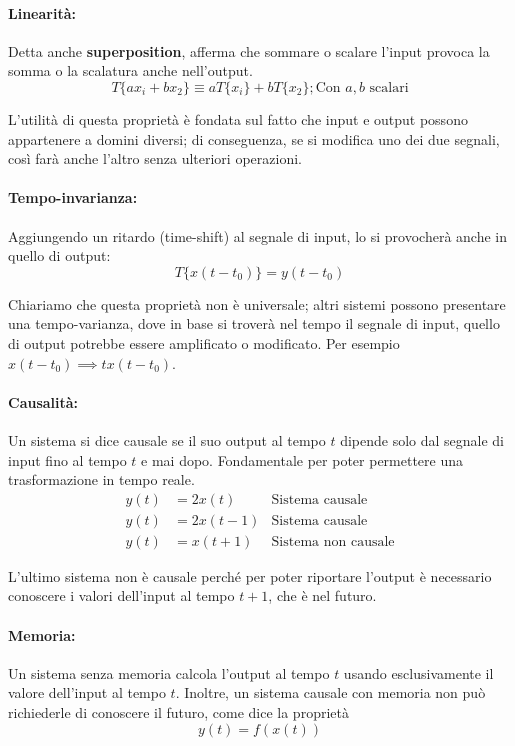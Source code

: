 \paragraph{Linearità:} Detta anche \textbf{superposition}, afferma che sommare o scalare l'input provoca la somma o la scalatura anche nell'output. \[
	T\{ax_i + bx_2\} \equiv aT\{x_i\} + bT\{x_2\}; \text{Con $a,b$ scalari}
\]

\noindent L'utilità di questa proprietà è fondata sul fatto che input e output possono appartenere a domini diversi; di conseguenza, se si modifica uno
dei due segnali, così farà anche l'altro senza ulteriori operazioni.

\paragraph{Tempo-invarianza:} Aggiungendo un ritardo (time-shift) al segnale di input, lo si provocherà anche in quello di output: \[
	T\{x(t-t_0)\} = y(t-t_0)
\]

\noindent Chiariamo che questa proprietà non è universale; altri sistemi possono presentare una tempo-varianza, dove in base si troverà nel tempo il
segnale di input, quello di output potrebbe essere amplificato o modificato. Per esempio $x(t-t_0) \implies tx(t-t_0)$.

\paragraph{Causalità:} Un sistema si dice causale se il suo output al tempo $t$ dipende solo dal segnale di input fino al tempo $t$ e mai dopo.
Fondamentale per poter permettere una trasformazione in tempo reale. \begin{equation}
    \begin{aligned}
        y(t) &= 2x(t) & \text{Sistema causale}\\
        y(t) &= 2x(t-1) & \text{Sistema causale}\\
        y(t) &= x(t+1) & \text{Sistema non causale}
    \end{aligned}
\end{equation}

\noindent L'ultimo sistema non è causale perché per poter riportare l'output è necessario conoscere i valori dell'input al tempo $t+1$, che è nel
futuro.

\paragraph{Memoria:} Un sistema senza memoria calcola l'output al tempo $t$ usando esclusivamente il valore dell'input al tempo $t$. Inoltre, un sistema
causale con memoria non può richiederle di conoscere il futuro, come dice la proprietà \[
	y(t) = f(x(t))
\]

